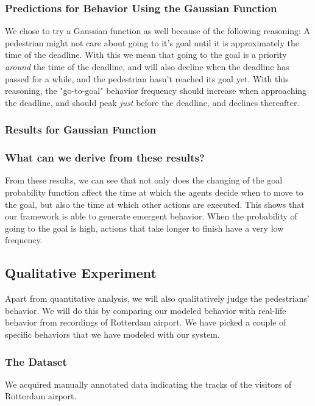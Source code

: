 \documentclass[11pt]{book}
\begin{document}
\subsubsection{Predictions for Behavior Using the Gaussian Function}
We chose to try a Gaussian function as well because of the following reasoning: A pedestrian might not care about going to it's goal until it is approximately the time of the deadline. With this we mean that going to the goal is a priority \emph{around} the time of the deadline, and will also decline when the deadline has passed for a while, and the pedestrian hasn't reached its goal yet. With this reasoning, the "go-to-goal" behavior frequency should increase when approaching the deadline, and should peak \emph{just} before the deadline, and declines thereafter.

\subsubsection{Results for Gaussian Function}


\subsubsection{What can we derive from these results?}
From these results, we can see that not only does the changing of the goal probability function affect the time at which the agents decide when to move to the goal, but also the time at which other actions are executed. This shows that our framework is able to generate emergent behavior. When the probability of going to the goal is high, actions that take longer to finish have a very low frequency.

\subsection{Qualitative Experiment}
Apart from quantitative analysis, we will also qualitatively judge the pedestrians' behavior. We will do this by comparing our modeled behavior with real-life behavior from recordings of Rotterdam airport. We have picked a couple of specific behaviors that we have modeled with our system.

\subsubsection{The Dataset}
We acquired manually annotated data indicating the tracks of the visitors of Rotterdam airport. 
\end{document}
